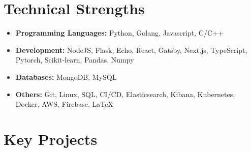 \documentclass[11pt,a4paper,calibri]{moderncv}        %
\begin{document}
	\vspace{-12pt}
	\section{Technical Strengths}
	
	\begin{itemize}[leftmargin=.2in]
		\setlength\itemsep{.2em}
		
		\item \textbf{Programming Languages:} Python, Golang, Javascript, C/C++
		\vspace{-4pt}
		\item \textbf{Development:} NodeJS, Flask, Echo, React, Gatsby, Next.js, TypeScript, Pytorch, Scikit-learn, Pandas, Numpy
		\vspace{-4pt}
		\item \textbf{Databases:} MongoDB, MySQL
		\vspace{-4pt}
		\item \textbf{Others:} Git, Linux, SQL, CI/CD, Elasticsearch, Kibana, Kubernetes, Docker, AWS, Firebase, \LaTeX
		
	\end{itemize}
	
	\vspace{-15pt}
	\section{Key Projects}
	
\end{document}
